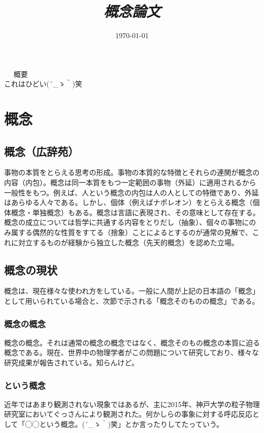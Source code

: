 \documentclass[12pt]{jsarticle}
\title{\HUGE \it{概念論文}}
\date{\today}
\begin{document}
\maketitle

\newpage
　
\newpage
{\huge 概要}\\
これはひどい\sf (´\_ゝ｀)笑

\newpage
\tableofcontents

\newpage
{}
\section{概念}

\subsection{概念（広辞苑）}
事物の本質をとらえる思考の形成。事物の本質的な特徴とそれらの連関が概念の内容（内包）。概念は同一本質をもつ一定範囲の事物（外延）に適用されるから一般性をもつ。例えば、人という概念の内包は人の人としての特徴であり、外延はあらゆる人々である。しかし、個体（例えばナポレオン）をとらえる概念（個体概念・単独概念）もある。概念は言語に表現され、その意味として存在する。概念の成立については哲学に共通する内容をとりだし（抽象）、個々の事物にのみ属する偶然的な性質をすてる（捨象）ことによるとするのが通常の見解で、これに対立するものが経験から独立した概念（先天的概念）を認めた立場。\\

\subsection{概念の現状}
概念は、現在様々な使われ方をしている。一般に人間が上記の日本語の「概念」として用いられている場合と、次節で示される「概念そのものの概念」である。\\

\subsubsection{概念の概念}
概念の概念。それは通常の概念の概念ではなく、概念そのもの概念の本質に迫る概念である。現在、世界中の物理学者がこの問題について研究しており、様々な研究成果が報告されている。知らんけど。

\subsubsection{という概念}
近年ではあまり観測されない現象ではあるが、主に2015年、神戸大学の粒子物理研究室においてぐっさんにより観測された。何かしらの事象に対する呼応反応として「◯◯という概念。{\sf (´\_ゝ｀)}笑」とか言ったりしてたっていう。
\end{document}
